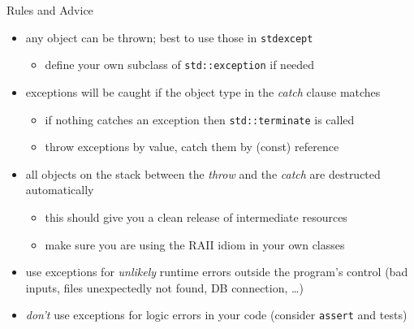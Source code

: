 \begin{frame}[fragile]
  \begin{block}{Rules and Advice}
    \begin{itemize}
      \item any object can be thrown; best to use those in \texttt{stdexcept}
      \begin{itemize}
        \item define your own subclass of \texttt{std::exception} if needed
      \end{itemize}
      \item exceptions will be caught if the object type in the \textit{catch} clause matches
      \begin{itemize}
          \item if nothing catches an exception then \texttt{std::terminate} is called
          \item throw exceptions by value, catch them by (const) reference
      \end{itemize}
      \item all objects on the stack between the \textit{throw} and the \textit{catch} are destructed automatically
      \begin{itemize}
        \item this should give you a clean release of intermediate resources
        \item make sure you are using the RAII idiom in your own classes
      \end{itemize}
      \item use exceptions for \textit{unlikely} runtime errors outside the program's control (bad inputs, files unexpectedly not found, DB connection, \ldots)
      \item \textit{don't} use exceptions for logic errors in your code (consider \texttt{assert} and tests)
    \end{itemize}
  \end{block}
\end{frame}

